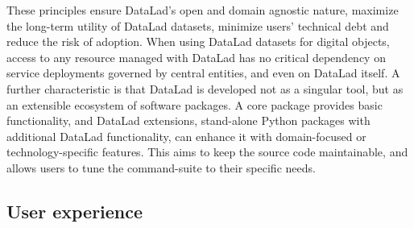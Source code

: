 {These principles ensure DataLad's open and domain agnostic nature, maximize the long-term utility of DataLad datasets, minimize users' technical debt and reduce the risk of adoption.
When using DataLad datasets for digital objects, access to any resource managed with DataLad has no critical dependency on service deployments governed by central entities, and even on DataLad itself.
A further characteristic is that DataLad is developed not as a singular tool, but as an extensible ecosystem of software packages.
A core package provides basic functionality, and DataLad extensions, stand-alone Python packages with additional DataLad functionality, can enhance it with domain-focused or technology-specific features.
This aims to keep the source code maintainable, and allows users to tune the command-suite to their specific needs.


\subsection{User experience}

}
